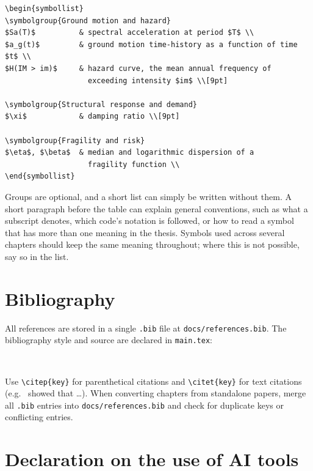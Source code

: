 \begin{verbatim}
\begin{symbollist}
\symbolgroup{Ground motion and hazard}
$Sa(T)$          & spectral acceleration at period $T$ \\
$a_g(t)$         & ground motion time-history as a function of time $t$ \\
$H(IM > im)$     & hazard curve, the mean annual frequency of
                   exceeding intensity $im$ \\[9pt]

\symbolgroup{Structural response and demand}
$\xi$            & damping ratio \\[9pt]

\symbolgroup{Fragility and risk}
$\eta$, $\beta$  & median and logarithmic dispersion of a
                   fragility function \\
\end{symbollist}
\end{verbatim}

Groups are optional, and a short list can simply be written without them. A short paragraph before the table can explain general conventions, such as what a subscript denotes, which code's notation is followed, or how to read a symbol that has more than one meaning in the thesis. Symbols used across several chapters should keep the same meaning throughout; where this is not possible, say so in the list.


\section{Bibliography}

All references are stored in a single \texttt{.bib} file at \texttt{docs/references.bib}. The bibliography style and source are declared in \texttt{main.tex}:

\begin{verbatim}


\end{verbatim}

Use \verb|\citep{key}| for parenthetical citations and \verb|\citet{key}| for text citations (e.g.\ \citet{Suzuki2020} showed that \ldots). When converting chapters from standalone papers, merge all \texttt{.bib} entries into \texttt{docs/references.bib} and check for duplicate keys or conflicting entries.


\section{Declaration on the use of AI tools}

